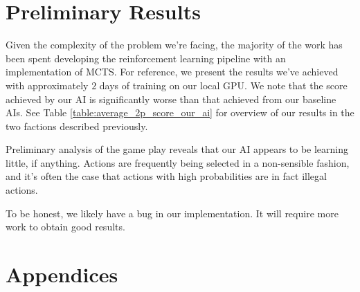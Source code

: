 \documentclass[8pt,twocolumn]{article}
\begin{document}
\section{Preliminary Results}
Given the complexity of the problem we're facing, the majority of the work has been spent developing the reinforcement learning pipeline with an implementation of MCTS. For reference, we present the results we've achieved with approximately $2$ days of training on our local GPU. We note that the score achieved by our AI is significantly worse than that achieved from our baseline AIs. See Table \ref{table:average_2p_score_our_ai} for overview of our results in the two factions described previously.

Preliminary analysis of the game play reveals that our AI appears to be learning little, if anything. Actions are frequently being selected in a non-sensible fashion, and it's often the case that actions with high probabilities are in fact illegal actions.

To be honest, we likely have a bug in our implementation. It will require more work to obtain good results.

\section{Appendices}
\end{document}
